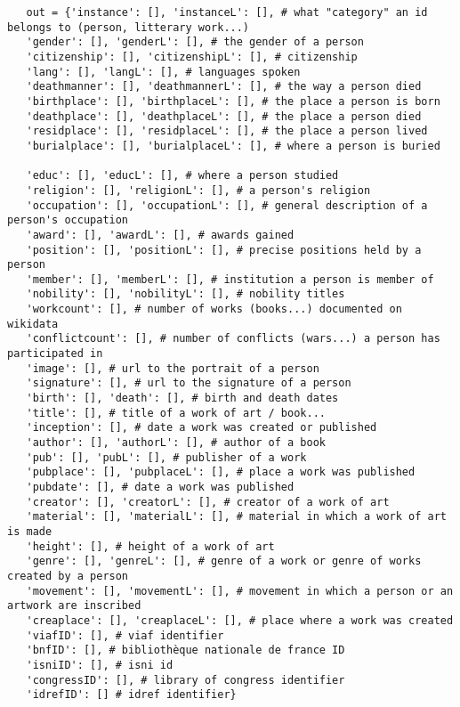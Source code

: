 \clearpage
\begin{listing}[ph!]
   \begin{verbatim}
   out = {'instance': [], 'instanceL': [], # what "category" an id belongs to (person, litterary work...)
   'gender': [], 'genderL': [], # the gender of a person
   'citizenship': [], 'citizenshipL': [], # citizenship
   'lang': [], 'langL': [], # languages spoken
   'deathmanner': [], 'deathmannerL': [], # the way a person died
   'birthplace': [], 'birthplaceL': [], # the place a person is born
   'deathplace': [], 'deathplaceL': [], # the place a person died
   'residplace': [], 'residplaceL': [], # the place a person lived
   'burialplace': [], 'burialplaceL': [], # where a person is buried

   'educ': [], 'educL': [], # where a person studied
   'religion': [], 'religionL': [], # a person's religion
   'occupation': [], 'occupationL': [], # general description of a person's occupation
   'award': [], 'awardL': [], # awards gained
   'position': [], 'positionL': [], # precise positions held by a person
   'member': [], 'memberL': [], # institution a person is member of
   'nobility': [], 'nobilityL': [], # nobility titles
   'workcount': [], # number of works (books...) documented on wikidata
   'conflictcount': [], # number of conflicts (wars...) a person has participated in
   'image': [], # url to the portrait of a person
   'signature': [], # url to the signature of a person
   'birth': [], 'death': [], # birth and death dates
   'title': [], # title of a work of art / book...
   'inception': [], # date a work was created or published
   'author': [], 'authorL': [], # author of a book
   'pub': [], 'pubL': [], # publisher of a work
   'pubplace': [], 'pubplaceL': [], # place a work was published
   'pubdate': [], # date a work was published
   'creator': [], 'creatorL': [], # creator of a work of art
   'material': [], 'materialL': [], # material in which a work of art is made
   'height': [], # height of a work of art
   'genre': [], 'genreL': [], # genre of a work or genre of works created by a person
   'movement': [], 'movementL': [], # movement in which a person or an artwork are inscribed
   'creaplace': [], 'creaplaceL': [], # place where a work was created
   'viafID': [], # viaf identifier
   'bnfID': [], # bibliothèque nationale de france ID
   'isniID': [], # isni id
   'congressID': [], # library of congress identifier
   'idrefID': [] # idref identifier}

   \end{verbatim}
\end{listing}

